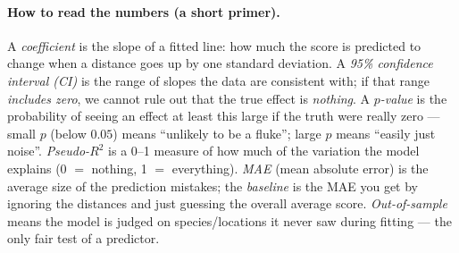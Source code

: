 \documentclass[11pt]{article}
\begin{document}
\paragraph{How to read the numbers (a short primer).}
A \emph{coefficient} is the slope of a fitted line: how much the score is predicted to change when a
distance goes up by one standard deviation. A \emph{95\% confidence interval (CI)} is the range of slopes
the data are consistent with; if that range \emph{includes zero}, we cannot rule out that the true effect
is \emph{nothing}. A \emph{$p$-value} is the probability of seeing an effect at least this large if the
truth were really zero --- small $p$ (below $0.05$) means ``unlikely to be a fluke''; large $p$ means
``easily just noise''. \emph{Pseudo-$R^2$} is a 0--1 measure of how much of the variation the model
explains (0 $=$ nothing, 1 $=$ everything). \emph{MAE} (mean absolute error) is the average size of the
prediction mistakes; the \emph{baseline} is the MAE you get by ignoring the distances and just guessing the
overall average score. \emph{Out-of-sample} means the model is judged on species/locations it never saw
during fitting --- the only fair test of a predictor.
\end{document}
